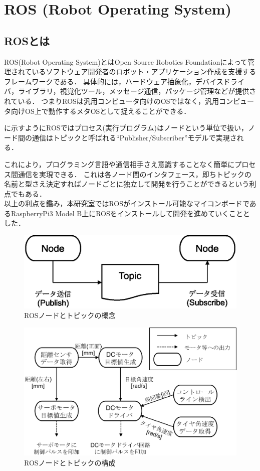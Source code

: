 \section{ROS (Robot Operating System)}
\subsection{ROSとは}
ROS(Robot Operating System)とはOpen Source Robotics Foundationによって管理されているソフトウェア開発者のロボット・アプリケーション作成を支援するフレームワークである．
具体的には，ハードウェア抽象化，デバイスドライバ，ライブラリ，視覚化ツール，メッセージ通信，パッケージ管理などが提供されている．
つまりROSは汎用コンピュータ向けのOSではなく，汎用コンピュータ向けOS上で動作するメタOSとして捉えることができる\cite{kurazume}．

に示すようにROSではプロセス(実行プログラム)はノードという単位で扱い，ノード間の通信はトピックと呼ばれる``Publisher/Subscriber''モデルで実現される\cite{ogura}．

これにより，プログラミング言語や通信相手さえ意識することなく簡単にプロセス間通信を実現できる．
これは各ノード間のインタフェース，即ちトピックの名前と型さえ決定すればノードごとに独立して開発を行うことができるという利点でもある．\\

以上の利点を鑑み，本研究室ではROSがインストール可能なマイコンボードであるRaspberryPi3 Model B上にROSをインストールして開発を進めていくこととした．

\begin{figure}[htb]
  \centering
    \includegraphics[width=0.5\hsize]{picture/eps/ros_topic.eps}
    \caption{ROSノードとトピックの概念}
    \label{fig::ros_topic}
\end{figure}



\begin{figure}[htb]
  \centering
    \includegraphics[width=0.8\hsize]{picture/eps/ros_nodes.eps}
    \caption{ROSノードとトピックの構成}
    \label{fig::ros_nodes}
\end{figure}

